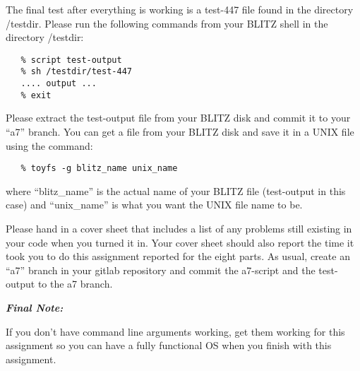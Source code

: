 \documentclass[11pt]{article}
\begin{document}
The final test after everything is working is a test-447 file
found in the directory /testdir.  Please run the following commands
from your BLITZ shell in the directory /testdir:

\begin{verbatim}
   % script test-output
   % sh /testdir/test-447
   .... output ...
   % exit
\end{verbatim}

Please extract the test-output file from your BLITZ disk and
commit it to your ``a7'' branch.   You can get a file from
your BLITZ disk and save it in a UNIX file using the command:

\begin{verbatim}
   % toyfs -g blitz_name unix_name
\end{verbatim}

where ``blitz\_name'' is the actual name of your BLITZ file
(test-output in this case) and ``unix\_name'' is what you
want the UNIX file name to be.

Please hand in a cover sheet that includes a list of any problems
still existing in your code when you turned it in.  Your cover sheet
should also report the time it took you to do this assignment reported
for the eight parts.  As usual, create an ``a7'' branch in your gitlab
repository and commit the a7-script and the test-output to the a7 branch.


\noindent
{\bf\em Final Note:}
    
If you don't have command line arguments working, get them working for
this assignment so you can have a fully functional OS when you finish
with this assignment.
\end{document}
